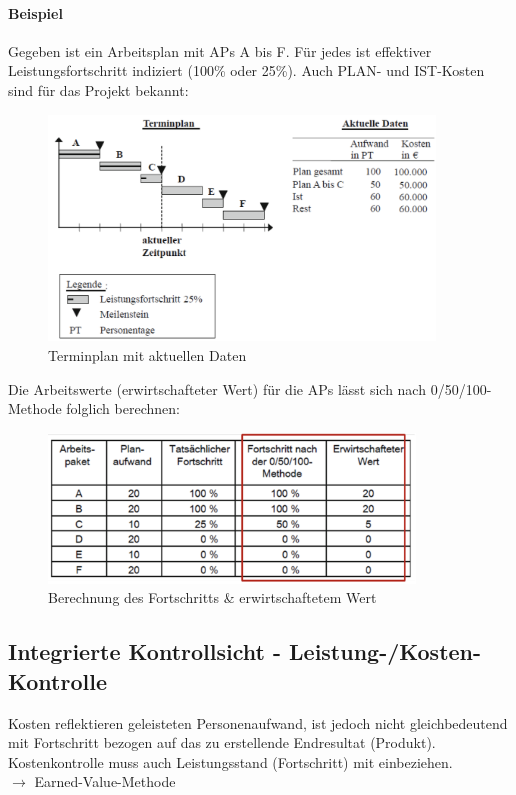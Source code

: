 \documentclass[a4paper]{article}
\begin{document}
\newpage
		
		\paragraph{Beispiel}
		
		Gegeben ist ein Arbeitsplan mit APs A bis F.
		Für jedes ist effektiver Leistungsfortschritt indiziert (100\% oder 25\%).
		Auch PLAN- und IST-Kosten sind für das Projekt bekannt:
		
		\begin{figure}[!htb]
			\centering
			\includegraphics[height=6cm]{img/pm/leistung_01.png}
			\caption{Terminplan mit aktuellen Daten}
			\label{fig:pm_leistung_01}
		\end{figure}
		\noindent
		Die Arbeitswerte (erwirtschafteter Wert) für die APs lässt sich nach 0/50/100-Methode folglich berechnen:
		
		\begin{figure}[!htb]
			\centering
			\includegraphics[height=4cm]{img/pm/leistung_02.png}
			\caption{Berechnung des Fortschritts \& erwirtschaftetem Wert}
			\label{fig:pm_leistung_02}
		\end{figure}
		
	\subsection{Integrierte Kontrollsicht - Leistung-/Kosten-Kontrolle}
	
	Kosten reflektieren geleisteten Personenaufwand, ist jedoch nicht gleichbedeutend mit Fortschritt bezogen auf das zu erstellende Endresultat (Produkt).
	Kostenkontrolle muss auch Leistungsstand (Fortschritt) mit einbeziehen.\\
	$\rightarrow$ Earned-Value-Methode
	
\end{document}
